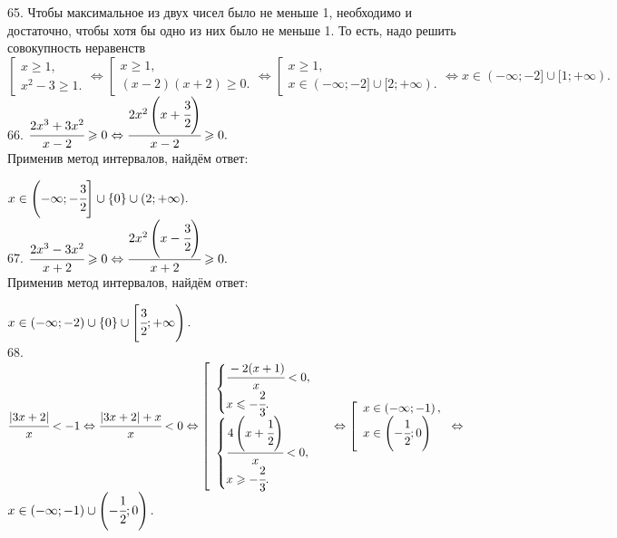 65. Чтобы максимальное из двух чисел было не меньше 1, необходимо и достаточно, чтобы хотя бы одно из них было не меньше 1. То есть, надо решить совокупность неравенств\\ $\left[\begin{array}{l}x\geqslant 1,\\ x^2-3 \geqslant1 .  \end{array}\right.\Leftrightarrow
\left[\begin{array}{l}x\geqslant 1,\\ (x-2)(x+2) \geqslant 0 .  \end{array}\right.\Leftrightarrow
\left[\begin{array}{l}x\geqslant 1,\\ x\in (-\infty;-2]\cup[2;+\infty).  \end{array}\right.\Leftrightarrow
x\in (-\infty;-2]\cup[1;+\infty).$\\
66. $\cfrac{2x^3+3x^2}{x-2}\geqslant0\Leftrightarrow\cfrac{2x^2\left(x+\cfrac{3}{2}\right)}{x-2}\geqslant0.$\\ Применив метод интервалов, найдём ответ:
\begin{figure}[ht!]
\end{figure}
$x\in\left(-\infty;-\cfrac{3}{2}\right]\cup\{0\}\cup(2;+\infty).$\\
67. $\cfrac{2x^3-3x^2}{x+2}\geqslant0\Leftrightarrow\cfrac{2x^2\left(x-\cfrac{3}{2}\right)}{x+2}\geqslant0.$\\ Применив метод интервалов, найдём ответ:
\begin{figure}[ht!]
\end{figure}
$x\in\left(-\infty;-2\right)\cup\{0\}\cup\left[\cfrac{3}{2};+\infty\right).$\\
68. $\cfrac{|3x+2|}{x}<-1\Leftrightarrow\cfrac{|3x+2|+x}{x}<0\Leftrightarrow
\left[\begin{array}{l}\begin{cases}\cfrac{-2(x+1)}{x}<0,\\ x\leqslant-\cfrac{2}{3}.\end{cases}\\ \begin{cases}\cfrac{4\left(x+\cfrac{1}{2}\right)}{x}<0,\\ x\geqslant-\cfrac{2}{3}.\end{cases}  \end{array}\right.\Leftrightarrow\left[\begin{array}{l} x\in\left(-\infty;-1\right),\\
x\in\left(-\cfrac{1}{2};0\right)\end{array}\right.\Leftrightarrow$\\$ x\in\left(-\infty;-1\right)\cup\left(-\cfrac{1}{2};0\right).$\\
